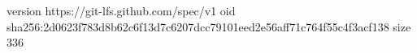 version https://git-lfs.github.com/spec/v1
oid sha256:2d0623f783d8b62c6f13d7c6207dcc79101eed2e56aff71c764f55c4f3acf138
size 336
